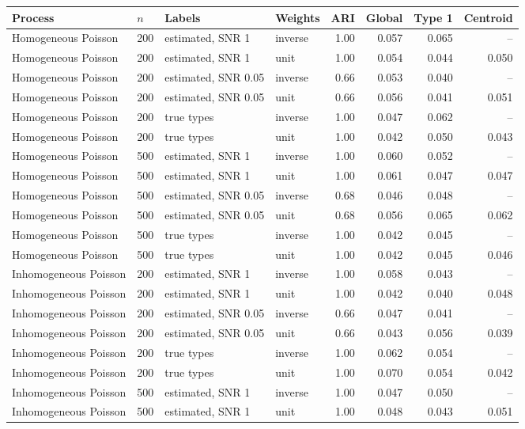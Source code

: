 \begin{tabular}{llllrrrr}
\toprule
Process & $n$ & Labels & Weights & ARI & Global & Type 1 & Centroid \\
\midrule
Homogeneous Poisson & 200 & estimated, SNR 1 & inverse & 1.00 & 0.057 & 0.065 & -- \\
Homogeneous Poisson & 200 & estimated, SNR 1 & unit & 1.00 & 0.054 & 0.044 & 0.050 \\
Homogeneous Poisson & 200 & estimated, SNR 0.05 & inverse & 0.66 & 0.053 & 0.040 & -- \\
Homogeneous Poisson & 200 & estimated, SNR 0.05 & unit & 0.66 & 0.056 & 0.041 & 0.051 \\
Homogeneous Poisson & 200 & true types & inverse & 1.00 & 0.047 & 0.062 & -- \\
Homogeneous Poisson & 200 & true types & unit & 1.00 & 0.042 & 0.050 & 0.043 \\
Homogeneous Poisson & 500 & estimated, SNR 1 & inverse & 1.00 & 0.060 & 0.052 & -- \\
Homogeneous Poisson & 500 & estimated, SNR 1 & unit & 1.00 & 0.061 & 0.047 & 0.047 \\
Homogeneous Poisson & 500 & estimated, SNR 0.05 & inverse & 0.68 & 0.046 & 0.048 & -- \\
Homogeneous Poisson & 500 & estimated, SNR 0.05 & unit & 0.68 & 0.056 & 0.065 & 0.062 \\
Homogeneous Poisson & 500 & true types & inverse & 1.00 & 0.042 & 0.045 & -- \\
Homogeneous Poisson & 500 & true types & unit & 1.00 & 0.042 & 0.045 & 0.046 \\
Inhomogeneous Poisson & 200 & estimated, SNR 1 & inverse & 1.00 & 0.058 & 0.043 & -- \\
Inhomogeneous Poisson & 200 & estimated, SNR 1 & unit & 1.00 & 0.042 & 0.040 & 0.048 \\
Inhomogeneous Poisson & 200 & estimated, SNR 0.05 & inverse & 0.66 & 0.047 & 0.041 & -- \\
Inhomogeneous Poisson & 200 & estimated, SNR 0.05 & unit & 0.66 & 0.043 & 0.056 & 0.039 \\
Inhomogeneous Poisson & 200 & true types & inverse & 1.00 & 0.062 & 0.054 & -- \\
Inhomogeneous Poisson & 200 & true types & unit & 1.00 & 0.070 & 0.054 & 0.042 \\
Inhomogeneous Poisson & 500 & estimated, SNR 1 & inverse & 1.00 & 0.047 & 0.050 & -- \\
Inhomogeneous Poisson & 500 & estimated, SNR 1 & unit & 1.00 & 0.048 & 0.043 & 0.051 \\

\end{tabular}
